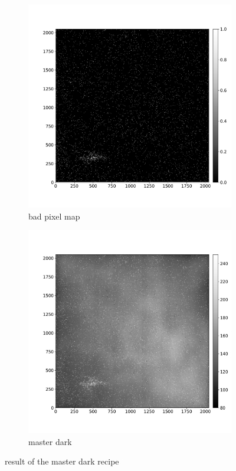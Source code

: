 \documentclass[twoside,single]{lion-msc}
\begin{document}
\begin{figure}[hb]
\centering
\begin{subfigure}{.5\textwidth}
  \centering
  \includegraphics[width=1\linewidth]{badpixelmap}
  \caption{bad pixel map}
\end{subfigure}%
\begin{subfigure}{.5\textwidth}
  \centering
  \includegraphics[width=1\linewidth]{dark}
  \caption{master dark}
\end{subfigure}
\caption{result of the master dark recipe}
\label{fig:masterdark}
\end{figure}
\end{document}
